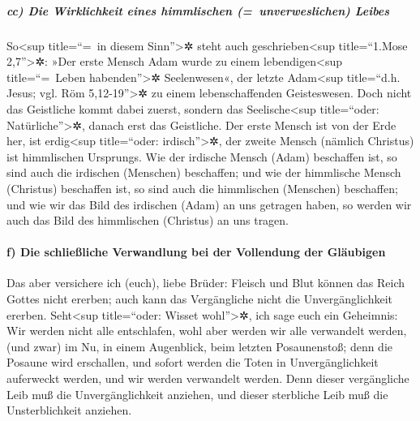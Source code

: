 \hypertarget{cc-die-wirklichkeit-eines-himmlischen-unverweslichen-leibes}{%
\subparagraph{cc) Die Wirklichkeit eines himmlischen (=~unverweslichen)
Leibes}\label{cc-die-wirklichkeit-eines-himmlischen-unverweslichen-leibes}}

 So\textless sup title=``=~in diesem Sinn''\textgreater✲
steht auch geschrieben\textless sup title=``1.Mose 2,7''\textgreater✲:
»Der erste Mensch Adam wurde zu einem lebendigen\textless sup
title=``=~Leben habenden''\textgreater✲ Seelenwesen«, der letzte
Adam\textless sup title=``d.h. Jesus; vgl. Röm 5,12-19''\textgreater✲ zu
einem lebenschaffenden Geisteswesen.  Doch nicht das
Geistliche kommt dabei zuerst, sondern das Seelische\textless sup
title=``oder: Natürliche''\textgreater✲, danach erst das Geistliche.
 Der erste Mensch ist von der Erde her, ist
erdig\textless sup title=``oder: irdisch''\textgreater✲, der zweite
Mensch (nämlich Christus) ist himmlischen Ursprungs.  Wie
der irdische Mensch (Adam) beschaffen ist, so sind auch die irdischen
(Menschen) beschaffen; und wie der himmlische Mensch (Christus)
beschaffen ist, so sind auch die himmlischen (Menschen) beschaffen;
 und wie wir das Bild des irdischen (Adam) an uns
getragen haben, so werden wir auch das Bild des himmlischen (Christus)
an uns tragen.

\hypertarget{f-die-schlieuxdfliche-verwandlung-bei-der-vollendung-der-gluxe4ubigen}{%
\paragraph{f) Die schließliche Verwandlung bei der Vollendung der
Gläubigen}\label{f-die-schlieuxdfliche-verwandlung-bei-der-vollendung-der-gluxe4ubigen}}

 Das aber versichere ich (euch), liebe Brüder: Fleisch
und Blut können das Reich Gottes nicht ererben; auch kann das
Vergängliche nicht die Unvergänglichkeit ererben. 
Seht\textless sup title=``oder: Wisset wohl''\textgreater✲, ich sage
euch ein Geheimnis: Wir werden nicht alle entschlafen, wohl aber werden
wir alle verwandelt werden,  (und zwar) im Nu, in einem
Augenblick, beim letzten Posaunenstoß; denn die Posaune wird erschallen,
und sofort werden die Toten in Unvergänglichkeit auferweckt werden, und
wir werden verwandelt werden.  Denn dieser vergängliche
Leib muß die Unvergänglichkeit anziehen, und dieser sterbliche Leib muß
die Unsterblichkeit anziehen.

